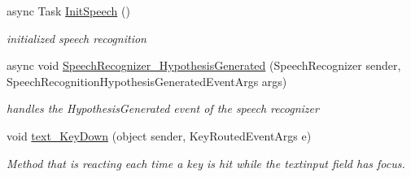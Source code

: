 \begin{DoxyCompactItemize}
async Task \hyperlink{class_listen_to_me_1_1_main_page_ac541bec23372af9da39117384c6b177e}{Init\+Speech} ()
\begin{DoxyCompactList}\small\item\em initialized speech recognition \end{DoxyCompactList}\item 
async void \hyperlink{class_listen_to_me_1_1_main_page_a78024cb9b68bafc3375081574dbbea89}{Speech\+Recognizer\+\_\+\+Hypothesis\+Generated} (Speech\+Recognizer sender, Speech\+Recognition\+Hypothesis\+Generated\+Event\+Args args)
\begin{DoxyCompactList}\small\item\em handles the Hypothesis\+Generated event of the speech recognizer \end{DoxyCompactList}\item 
void \hyperlink{class_listen_to_me_1_1_main_page_a2b101dc0c72c1dcb73fe756a5847940e}{text\+\_\+\+Key\+Down} (object sender, Key\+Routed\+Event\+Args e)
\begin{DoxyCompactList}\small\item\em Method that is reacting each time a key is hit while the textinput field has focus. \end{DoxyCompactList}\end{DoxyCompactItemize}
